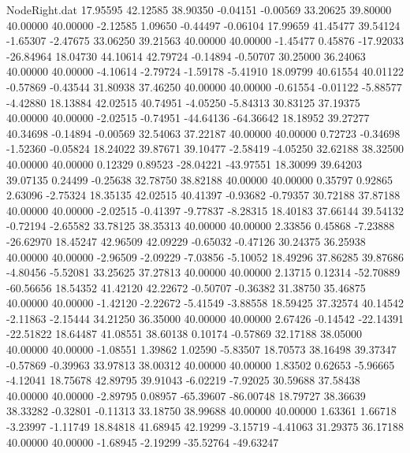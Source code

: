 \begin{filecontents}{NodeRight.dat}
  17.95595   42.12585   38.90350    -0.04151   -0.00569   33.20625   39.80000   40.00000   40.00000   -2.12585    1.09650   -0.44497   -0.06104
  17.99659   41.45477   39.54124    -1.65307   -2.47675   33.06250   39.21563   40.00000   40.00000   -1.45477    0.45876  -17.92033  -26.84964
  18.04730   44.10614   42.79724    -0.14894   -0.50707   30.25000   36.24063   40.00000   40.00000   -4.10614   -2.79724   -1.59178   -5.41910
  18.09799   40.61554   40.01122    -0.57869   -0.43544   31.80938   37.46250   40.00000   40.00000   -0.61554   -0.01122   -5.88577   -4.42880
  18.13884   42.02515   40.74951    -4.05250   -5.84313   30.83125   37.19375   40.00000   40.00000   -2.02515   -0.74951  -44.64136  -64.36642
  18.18952   39.27277   40.34698    -0.14894   -0.00569   32.54063   37.22187   40.00000   40.00000    0.72723   -0.34698   -1.52360   -0.05824
  18.24022   39.87671   39.10477    -2.58419   -4.05250   32.62188   38.32500   40.00000   40.00000    0.12329    0.89523  -28.04221  -43.97551
  18.30099   39.64203   39.07135     0.24499   -0.25638   32.78750   38.82188   40.00000   40.00000    0.35797    0.92865    2.63096   -2.75324
  18.35135   42.02515   40.41397    -0.93682   -0.79357   30.72188   37.87188   40.00000   40.00000   -2.02515   -0.41397   -9.77837   -8.28315
  18.40183   37.66144   39.54132    -0.72194   -2.65582   33.78125   38.35313   40.00000   40.00000    2.33856    0.45868   -7.23888  -26.62970
  18.45247   42.96509   42.09229    -0.65032   -0.47126   30.24375   36.25938   40.00000   40.00000   -2.96509   -2.09229   -7.03856   -5.10052
  18.49296   37.86285   39.87686    -4.80456   -5.52081   33.25625   37.27813   40.00000   40.00000    2.13715    0.12314  -52.70889  -60.56656
  18.54352   41.42120   42.22672    -0.50707   -0.36382   31.38750   35.46875   40.00000   40.00000   -1.42120   -2.22672   -5.41549   -3.88558
  18.59425   37.32574   40.14542    -2.11863   -2.15444   34.21250   36.35000   40.00000   40.00000    2.67426   -0.14542  -22.14391  -22.51822
  18.64487   41.08551   38.60138     0.10174   -0.57869   32.17188   38.05000   40.00000   40.00000   -1.08551    1.39862    1.02590   -5.83507
  18.70573   38.16498   39.37347    -0.57869   -0.39963   33.97813   38.00312   40.00000   40.00000    1.83502    0.62653   -5.96665   -4.12041
  18.75678   42.89795   39.91043    -6.02219   -7.92025   30.59688   37.58438   40.00000   40.00000   -2.89795    0.08957  -65.39607  -86.00748
  18.79727   38.36639   38.33282    -0.32801   -0.11313   33.18750   38.99688   40.00000   40.00000    1.63361    1.66718   -3.23997   -1.11749
  18.84818   41.68945   42.19299    -3.15719   -4.41063   31.29375   36.17188   40.00000   40.00000   -1.68945   -2.19299  -35.52764  -49.63247

\end{filecontents}

